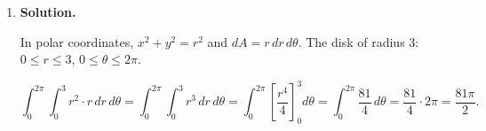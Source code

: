 \begin{enumerate}
\begin{align*}
&\int_{-2}^{2}\int_0^{(y+1)^2}(4-x-y)\,dx\,dy = \int_{-2}^2\left[4x-\frac{x^2}{2}-xy\right]_0^{(y+1)^2}dy \\
&= \int_{-2}^2\left[4(y+1)^2 - \frac{(y+1)^4}{2} - y(y+1)^2\right]dy.
\end{align*}

Let $u = y+1$, $y = u-1$, $dy = du$, and when $y=-2$, $u=-1$; when $y=2$, $u=3$:
\[
= \int_{-1}^3\left[4u^2 - \frac{u^4}{2}-(u-1)u^2\right]du = \int_{-1}^3\left[4u^2-\frac{u^4}{2}-u^3+u^2\right]du
\]
\[
= \int_{-1}^3\left(5u^2-u^3-\frac{u^4}{2}\right)du.
\]

\[
= \left[\frac{5u^3}{3}-\frac{u^4}{4}-\frac{u^5}{10}\right]_{-1}^3.
\]

At $u=3$: $\frac{5(27)}{3}-\frac{81}{4}-\frac{243}{10} = 45-\frac{81}{4}-\frac{243}{10}$.

Common denominator 20: $\frac{900-405-486}{20} = \frac{9}{20}$.

At $u=-1$: $\frac{5(-1)}{3}-\frac{1}{4}-\frac{-1}{10} = -\frac{5}{3}-\frac{1}{4}+\frac{1}{10}$.

Common denominator 60: $\frac{-100-15+6}{60} = \frac{-109}{60}$.

Result: $\frac{9}{20}+\frac{109}{60} = \frac{27+109}{60} = \frac{136}{60} = \boxed{\dfrac{34}{15}}$.

\item \textbf{Solution.}
\begin{center}
\end{center}
In polar coordinates, $x^2+y^2 = r^2$ and $dA = r\,dr\,d\theta$. The disk of radius 3: $0\le r\le 3$, $0\le\theta\le 2\pi$.

\[
\int_0^{2\pi}\int_0^3 r^2\cdot r\,dr\,d\theta = \int_0^{2\pi}\int_0^3 r^3\,dr\,d\theta = \int_0^{2\pi}\left[\frac{r^4}{4}\right]_0^3 d\theta = \int_0^{2\pi}\frac{81}{4}\,d\theta = \frac{81}{4}\cdot 2\pi = \boxed{\frac{81\pi}{2}}.
\]


\end{enumerate}
